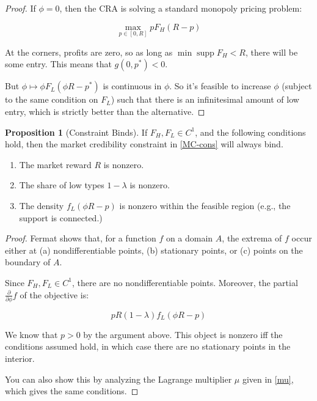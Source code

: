 \documentclass{article}
\theoremstyle{definition}
\newtheorem{proposition}{Proposition}
\DeclareMathOperator\supp{supp}
\begin{document}
\begin{proof}
    If $\phi = 0$, then the CRA is solving a standard monopoly pricing problem: 

    \[ \max\limits_{p \in [0, R]} p F_H(R - p) \]

    At the corners, profits are zero, so as long as $\min \supp F_H < R$, there will be some entry. This means that $g(0, p^*) < 0$.

    But $\phi \mapsto \phi F_L(\phi R - p^*)$ is continuous in $\phi$. So it's feasible to increase $\phi$ (subject to the same condition on $F_L$) such that there is an infinitesimal amount of low entry, which is strictly better than the alternative. 
\end{proof}

\newpage

\begin{proposition}[Constraint Binds] If $F_H, F_L \in C^1$, and the following conditions hold, then the market credibility constraint in \eqref{MC-cons} will always bind.

\begin{enumerate}
    \item The market reward $R$ is nonzero.
    \item The share of low types $1 - \lambda$ is nonzero.
    \item The density $f_L(\phi R - p)$ is nonzero within the feasible region (e.g., the support is connected.)
\end{enumerate}

\end{proposition} 

\begin{proof}
    Fermat shows that, for a function $f$ on a domain $A$, the extrema of $f$ occur either at (a) nondifferentiable points, (b) stationary points, or (c) points on the boundary of $A$.

    Since $F_H, F_L \in C^1$, there are no nondifferentiable points. Moreover, the partial $\frac{\partial}{\partial \phi}f$ of the objective is: 

    \[ pR(1 - \lambda)f_L(\phi R - p) \]

    We know that $p > 0$ by the argument above. This object is nonzero iff the conditions assumed hold, in which case there are no stationary points in the interior.

    You can also show this by analyzing the Lagrange multiplier $\mu$ given in \eqref{mu}, which gives the same conditions.
\end{proof}
\end{document}
